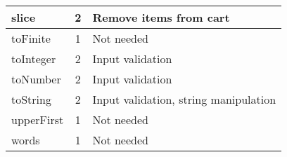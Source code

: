 \documentclass[a4paper, 12pt]{article}
\begin{document}
\begin{table}[h]
\begin{tabular}{l|c|l}
    slice        & 2                 & Remove items from cart                \\ \hline
    toFinite     & 1                 & Not needed                            \\ \hline
    toInteger    & 2                 & Input validation                      \\ \hline
    toNumber     & 2                 & Input validation                      \\  \hline
    toString     & 2                 & Input validation, string manipulation \\ \hline
    upperFirst   & 1                 & Not needed                            \\ \hline
    words        & 1                 & Not needed                           
    \end{tabular}
    \end{table}








            
\end{document}
